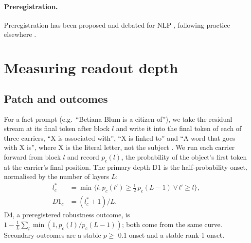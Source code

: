 \documentclass[11pt]{article}
\begin{document}
\paragraph{Preregistration.}
Preregistration has been proposed and debated for NLP \citep{vanmiltenburg2021prereg,sogaard2023prereg}, following practice elsewhere \citep{nosek2018prereg}.

\section{Measuring readout depth}
\label{sec:measure}
\subsection{Patch and outcomes}
For a fact prompt (e.g.\ ``Betiana Blum is a citizen of''), we take the residual stream at its final token after block $l$ and write it into the final token of each of three carriers, ``X is associated with'', ``X is linked to'' and ``A word that goes with X is'', where X is the literal letter, not the subject \citep{zhang2024patching,heimersheim2024patching}.
We run each carrier forward from block $l$ and record $p_c(l)$, the probability of the object's first token at the carrier's final position.
The primary depth D1 is the half-probability onset, normalised by the number of layers $L$:
\begin{align}
l^{*}_c&=\min\{l : p_c(l') \ge \tfrac{1}{2}\,p_c(L-1)\ \forall\, l' \ge l\}, \\ %
D1_c&=(l^{*}_c+1)/L. %
\end{align}
D4, a preregistered robustness outcome, is $1-\tfrac{1}{L}\sum_l \min(1, p_c(l)/p_c(L-1))$; both come from the same curve. %
Secondary outcomes are a stable $p \ge$ 0.1 onset and a stable rank-1 onset. %
\end{document}
